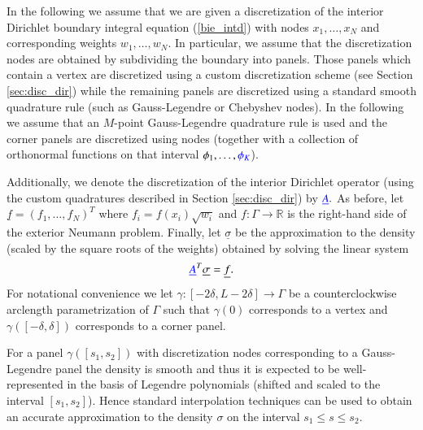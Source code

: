 In the following we assume that we are given a discretization of the interior Dirichlet boundary integral equation (\ref{bie_intd}) with nodes $x_1,\dots,x_N$ and corresponding weights $w_1,\dots,w_N.$ In particular, we assume that the discretization nodes are obtained by subdividing the boundary into panels. Those panels which contain a vertex are discretized using a custom discretization scheme (see Section \ref{sec:disc_dir}) while the remaining panels are discretized using a standard smooth quadrature rule (such as Gauss-Legendre or Chebyshev nodes). In the following we assume that an $M$-point Gauss-Legendre quadrature rule is used and the corner panels are discretized using  nodes (together with a collection of orthonormal functions on that interval $\phi_1,\dots,{\color{blue} \phi_K}$).

Additionally, we denote the discretization of the interior Dirichlet operator (using the custom quadratures described in Section \ref{sec:disc_dir}) by ${\color{blue} \underline{A}}.$ As before, let $\underline{f} = (f_1,\dots,f_N)^T$ where $f_i = f(x_i) \sqrt{w_i}$ and $f: \Gamma \to \mathbb{R}$ is the right-hand side of the exterior Neumann problem. Finally, let $\underline{\sigma}$ be the approximation to the density (scaled by the square roots of the weights) obtained by solving the linear system
\begin{align}\label{eqn:adj_linalg}
{\color{blue} \underline{A}}^T \underline{\sigma} = \underline{f}.
\end{align}
For notational convenience we let $\gamma:[-2\delta,L-2\delta] \to \Gamma$ be a counterclockwise arclength parametrization of $\Gamma$ such that  $\gamma(0)$ corresponds to a vertex and $\gamma([-\delta,\delta])$ corresponds to a corner panel.

For a panel $\gamma([s_1,s_2])$ with discretization nodes  corresponding to a Gauss-Legendre panel the density is smooth and thus it is expected to be well-represented in the basis of Legendre polynomials (shifted and scaled to the interval $[s_1,s_2]$). Hence standard interpolation techniques can be used to obtain an accurate approximation to the density $\sigma$ on the interval $s_1 \le s\le s_2.$ 

